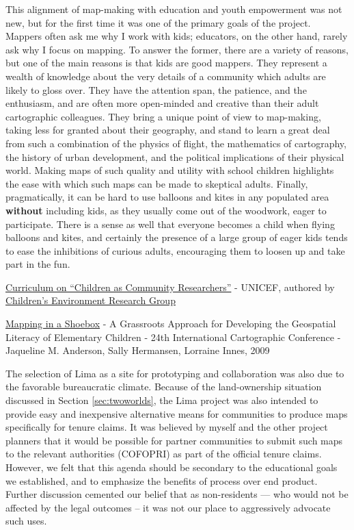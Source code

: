 \documentclass[11pt]{report}
\begin{document}
This alignment of map-making with education and youth empowerment was not new, but for the first time it was one of the primary goals of the project. Mappers often ask me why I work with kids; educators, on the other hand, rarely ask why I focus on mapping. To answer the former, there are a variety of reasons, but one of the main reasons is that kids are good mappers. They represent a wealth of knowledge about the very details of a community which adults are likely to gloss over. They have the attention span, the patience, and the enthusiasm, and are often more open-minded and creative than their adult cartographic colleagues. They bring a unique point of view to map-making, taking less for granted about their geography, and stand to learn a great deal from such a combination of the physics of flight, the mathematics of cartography, the history of urban development, and the political implications of their physical world. Making maps of such quality and utility with school children highlights the ease with which such maps can be made to skeptical adults. Finally, pragmatically, it can be hard to use balloons and kites in any populated area \textbf{without} including kids, as they usually come out of the woodwork, eager to participate. There is a sense as well that everyone becomes a child when flying balloons and kites, and certainly the presence of a large group of eager kids tends to ease the inhibitions of curious adults, encouraging them to loosen up and take part in the fun. 

\href{http://www.unicef.org/teachers/researchers/intro.htm}{Curriculum on ``{}Children as Community Researchers''{}} - UNICEF, authored by \href{http://web.gc.cuny.edu/che/cerg/about_cerg/environmental_learning_index.htm}{Children'{}s Environment Research Group}

\href{http://training.esri.com/campus/library/bibliography/RecordDetail.cfm?ID=95545&browseonly=0}{Mapping in a Shoebox} - A Grassroots Approach for Developing the Geospatial Literacy of Elementary Children - 24th International Cartographic Conference - Jaqueline M. Anderson, Sally Hermansen, Lorraine Innes, 2009

The selection of Lima as a site for prototyping and collaboration was also due to the favorable bureaucratic climate. Because of the land-ownership situation discussed in Section \ref{sec:twoworlds}, the Lima project was also intended to provide easy and inexpensive alternative means for communities to produce maps specifically for tenure claims. It was believed by myself and the other project planners that it would be possible for partner communities to submit such maps to the relevant authorities (COFOPRI) as part of the official tenure claims. However, we felt that this agenda should be secondary to the educational goals we established, and to emphasize the benefits of process over end product. Further discussion cemented our belief that as non-residents --- who would not be affected by the legal outcomes -- it was not our place to aggressively advocate such uses. 
\end{document}
